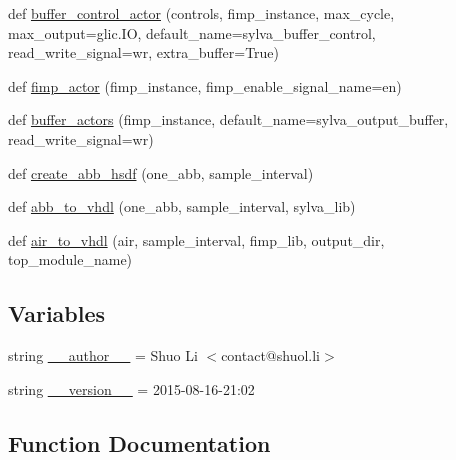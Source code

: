 \begin{DoxyCompactItemize}
\item 
def \hyperlink{namespacesylva_1_1code__generation_1_1air_a1a46162a8988513e15b0b45a4b456340}{buffer\+\_\+control\+\_\+actor} (controls, fimp\+\_\+instance, max\+\_\+cycle, max\+\_\+output=glic.\+IO, default\+\_\+name=\textquotesingle{}sylva\+\_\+buffer\+\_\+control\textquotesingle{}, read\+\_\+write\+\_\+signal=\textquotesingle{}wr\textquotesingle{}, extra\+\_\+buffer=True)
\item 
def \hyperlink{namespacesylva_1_1code__generation_1_1air_a5a82ebeeb6def57b9dc6784ab9cd43f4}{fimp\+\_\+actor} (fimp\+\_\+instance, fimp\+\_\+enable\+\_\+signal\+\_\+name=\textquotesingle{}en\textquotesingle{})
\item 
def \hyperlink{namespacesylva_1_1code__generation_1_1air_a2437e8f4411d574d2a354bee377e1e31}{buffer\+\_\+actors} (fimp\+\_\+instance, default\+\_\+name=\textquotesingle{}sylva\+\_\+output\+\_\+buffer\textquotesingle{}, read\+\_\+write\+\_\+signal=\textquotesingle{}wr\textquotesingle{})
\item 
def \hyperlink{namespacesylva_1_1code__generation_1_1air_a5a2588aa1c35ad4bd47d3b8f7eeca94a}{create\+\_\+abb\+\_\+hsdf} (one\+\_\+abb, sample\+\_\+interval)
\item 
def \hyperlink{namespacesylva_1_1code__generation_1_1air_a353257c84de380833218457a45c3f2a3}{abb\+\_\+to\+\_\+vhdl} (one\+\_\+abb, sample\+\_\+interval, sylva\+\_\+lib)
\item 
def \hyperlink{namespacesylva_1_1code__generation_1_1air_a12c49366c61395ad719575c8715849cc}{air\+\_\+to\+\_\+vhdl} (air, sample\+\_\+interval, fimp\+\_\+lib, output\+\_\+dir, top\+\_\+module\+\_\+name)
\end{DoxyCompactItemize}
\subsection*{Variables}
\begin{DoxyCompactItemize}
\item 
string \hyperlink{namespacesylva_1_1code__generation_1_1air_adfbe6169cf7f46d110aa5f8a54023255}{\+\_\+\+\_\+author\+\_\+\+\_\+} = \textquotesingle{}Shuo Li $<$contact@shuol.\+li$>$\textquotesingle{}
\item 
string \hyperlink{namespacesylva_1_1code__generation_1_1air_a70ecf80fff7754a800b4eef41e1718d2}{\+\_\+\+\_\+version\+\_\+\+\_\+} = \textquotesingle{}2015-\/08-\/16-\/21\+:02\textquotesingle{}
\end{DoxyCompactItemize}


\subsection{Function Documentation}
\mbox{\label{namespacesylva_1_1code__generation_1_1air_a353257c84de380833218457a45c3f2a3}} 
